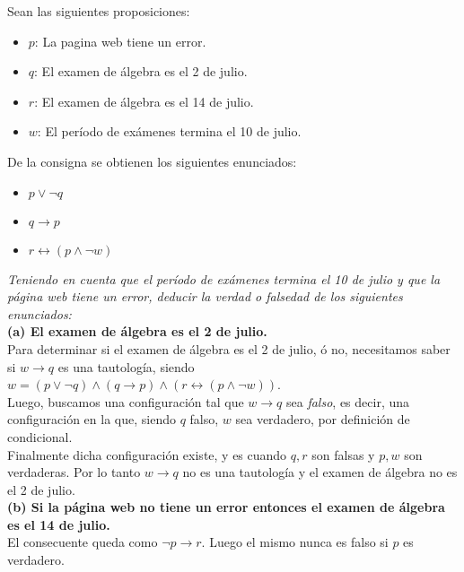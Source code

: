 \documentclass[lnbip]{svmultln}
\begin{document}
Sean las siguientes proposiciones:

\begin{itemize}
  \item $p$: La pagina web tiene un error.
  \item $q$: El examen de álgebra es el 2 de julio.
  \item $r$: El examen de álgebra es el 14 de julio.
  \item $w$: El período de exámenes termina el 10 de julio.
\end{itemize}

De la consigna se obtienen los siguientes enunciados:

\begin{itemize}
  \item $p \vee \neg q$
  \item $q \rightarrow p$
  \item $r \leftrightarrow (p \wedge \neg w)$
\end{itemize}

\textit{Teniendo en cuenta que el período de exámenes termina el 10 de julio y que la página web tiene un error, deducir la verdad o falsedad de los siguientes enunciados:} \\

\textbf{(a) El examen de álgebra es el 2 de julio.} \\

Para determinar si el examen de álgebra es el 2 de julio, ó no, necesitamos saber si $w \rightarrow q$ es una tautología, siendo  $w = (p \vee \neg q) \wedge (q \rightarrow p) \wedge (r \leftrightarrow (p \wedge \neg w))$. \\

Luego, buscamos una configuración tal que $w \rightarrow q$ sea \textit{falso}, es decir, una configuración en la que, siendo $q$ falso, $w$ sea verdadero, por definición de condicional. \\

Finalmente dicha configuración existe, y es cuando $q, r$ son falsas y $p, w$ son verdaderas. Por lo tanto $w \rightarrow q$ no es una tautología y el examen de álgebra no es el 2 de julio. \\

\textbf{(b) Si la página web no tiene un error entonces el examen de álgebra es el 14 de julio.} \\

El consecuente queda como $\neg p \rightarrow r$. Luego el mismo nunca es falso si $p$ es verdadero. \\
\end{document}
